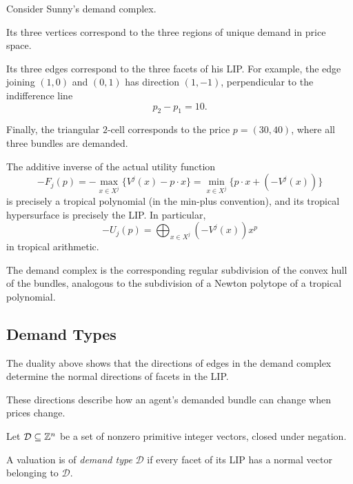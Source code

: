 \documentclass[../../main.tex]{subfiles}
\begin{document}
\begin{example}
    Consider Sunny's demand complex.

    Its three vertices correspond to the three regions of
    unique demand in price space.

    Its three edges correspond to the three facets of his LIP.
    For example, the edge joining $(1,0)$ and $(0,1)$ has
    direction $(1,-1)$, perpendicular to the indifference
    line
    \[
        p_2-p_1=10.
    \]

    Finally, the triangular $2$-cell corresponds to the
    price $p=(30,40)$, where all three bundles are demanded.

\end{example}

\begin{rmk}
    The additive inverse of the actual utility function
    \[
        -F_j(p)=-\max_{x\in X^j}\{V^j(x)-p\cdot x\}=\min_{x \in X^j}\{p\cdot x+(-V^j(x))\}
    \]
    is precisely a tropical polynomial (in the min-plus convention),
    and its tropical hypersurface is precisely the LIP. In particular,
    \[
        -U_j(p)=\bigoplus_{x \in X^j}(-V^j(x))x^p
    \]
    in tropical arithmetic. 
    
    The demand complex is the corresponding regular subdivision
    of the convex hull of the bundles, analogous to the
    subdivision of a Newton polytope of a tropical polynomial.
\end{rmk}



\subsection{Demand Types}

The duality above shows that the directions of edges in
the demand complex determine the normal directions of
facets in the LIP.

These directions describe how an agent's demanded bundle
can change when prices change.

\begin{defin}
    Let $\mathcal D\subseteq\mathbb{Z}^n$ be a set of nonzero
    primitive integer vectors, closed under negation.

    A valuation is of \textit{demand type} $\mathcal D$
    if every facet of its LIP has a normal vector
    belonging to $\mathcal D$.
\end{defin}
\end{document}
